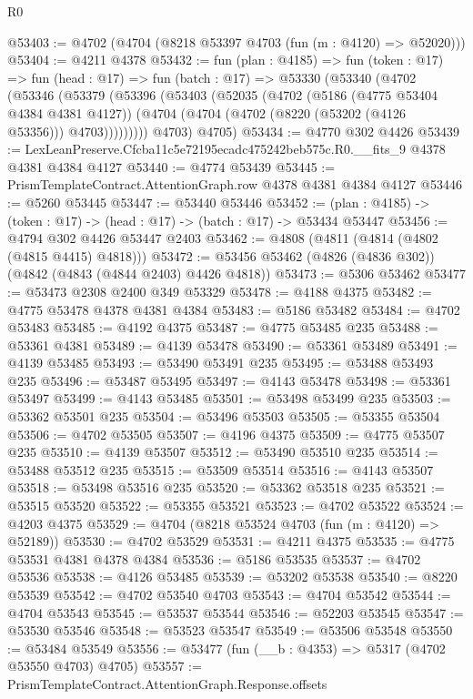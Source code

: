 \begin{lexlean}{R0}
\begin{coremodule}
@53403 := @4702 (@4704 (@8218 @53397 @4703 (fun (m : @4120) => @52020)))
@53404 := @4211 @4378
@53432 := fun (plan : @4185) =>
  fun (token : @17) =>
  fun (head : @17) =>
  fun (batch : @17) =>
  @53330
    (@53340
      (@4702
        (@53346
          (@53379
            (@53396
              (@53403
                (@52035
                  (@4702
                    (@5186 (@4775 @53404 @4384 @4381 @4127))
                    (@4704 (@4704 (@4702 (@8220 (@53202 (@4126 @53356))) @4703)))))))))
        @4703)
      @4705)
@53434 := @4770 @302 @4426
@53439 := LexLeanPreserve.Cfcba11c5e72195ecadc475242beb575c.R0.__fits_9 @4378 @4381 @4384 @4127
@53440 := @4774 @53439
@53445 := PrismTemplateContract.AttentionGraph.row @4378 @4381 @4384 @4127
@53446 := @5260 @53445
@53447 := @53440 @53446
@53452 := (plan : @4185) -> (token : @17) -> (head : @17) -> (batch : @17) -> @53434 @53447
@53456 := @4794 @302 @4426 @53447 @2403
@53462 := @4808 (@4811 (@4814 (@4802 (@4815 @4415) @4818)))
@53472 := @53456 @53462 (@4826 (@4836 @302)) (@4842 (@4843 (@4844 @2403) @4426 @4818))
@53473 := @5306 @53462
@53477 := @53473 @2308 @2400 @349 @53329
@53478 := @4188 @4375
@53482 := @4775 @53478 @4378 @4381 @4384
@53483 := @5186 @53482
@53484 := @4702 @53483
@53485 := @4192 @4375
@53487 := @4775 @53485 @235
@53488 := @53361 @4381
@53489 := @4139 @53478
@53490 := @53361 @53489
@53491 := @4139 @53485
@53493 := @53490 @53491 @235
@53495 := @53488 @53493 @235
@53496 := @53487 @53495
@53497 := @4143 @53478
@53498 := @53361 @53497
@53499 := @4143 @53485
@53501 := @53498 @53499 @235
@53503 := @53362 @53501 @235
@53504 := @53496 @53503
@53505 := @53355 @53504
@53506 := @4702 @53505
@53507 := @4196 @4375
@53509 := @4775 @53507 @235
@53510 := @4139 @53507
@53512 := @53490 @53510 @235
@53514 := @53488 @53512 @235
@53515 := @53509 @53514
@53516 := @4143 @53507
@53518 := @53498 @53516 @235
@53520 := @53362 @53518 @235
@53521 := @53515 @53520
@53522 := @53355 @53521
@53523 := @4702 @53522
@53524 := @4203 @4375
@53529 := @4704 (@8218 @53524 @4703 (fun (m : @4120) => @52189))
@53530 := @4702 @53529
@53531 := @4211 @4375
@53535 := @4775 @53531 @4381 @4378 @4384
@53536 := @5186 @53535
@53537 := @4702 @53536
@53538 := @4126 @53485
@53539 := @53202 @53538
@53540 := @8220 @53539
@53542 := @4702 @53540 @4703
@53543 := @4704 @53542
@53544 := @4704 @53543
@53545 := @53537 @53544
@53546 := @52203 @53545
@53547 := @53530 @53546
@53548 := @53523 @53547
@53549 := @53506 @53548
@53550 := @53484 @53549
@53556 := @53477 (fun (__b : @4353) => @5317 (@4702 @53550 @4703) @4705)
@53557 := PrismTemplateContract.AttentionGraph.Response.offsets

\end{coremodule}
\end{lexlean}

